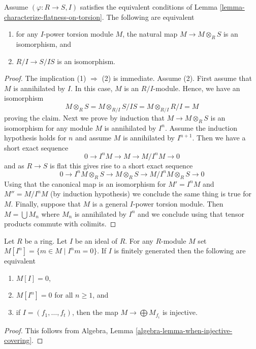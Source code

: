 \begin{lemma}
\label{lemma-neighbourhood-isomorphism}
Assume $(\varphi : R \to S, I)$ satisfies the equivalent conditions of
Lemma \ref{lemma-characterize-flatness-on-torsion}.
The following are equivalent
\begin{enumerate}
\item for any $I$-power torsion module $M$, the natural map
$M \to M \otimes_R S$ is an isomorphism, and
\item $R/I \to S/IS$ is an isomorphism.
\end{enumerate}
\end{lemma}

\begin{proof}
The implication (1) $\Rightarrow$ (2) is immediate.
Assume (2). First assume that $M$ is annihilated by $I$.
In this case, $M$ is an $R/I$-module. Hence, we have an isomorphism  
$$
M \otimes_R S = M \otimes_{R/I} S/IS = M \otimes_{R/I} R/I = M
$$
proving the claim. Next we prove by induction that $M \to M \otimes_R S$
is an isomorphism for any module $M$ is annihilated by $I^n$. Assume
the induction hypothesis holds for $n$ and assume $M$ is annihilated by
$I^{n + 1}$. Then we have a short exact sequence
$$
0 \to I^nM \to M \to M/I^nM \to 0
$$
and as $R \to S$ is flat this gives rise to a short exact sequence
$$
0 \to I^nM \otimes_R S \to M \otimes_R S \to M/I^nM \otimes_R S \to 0
$$
Using that the canonical map is an isomorphism for $M' = I^nM$ and
$M'' = M/I^nM$ (by induction hypothesis) we conclude the same thing is
true for $M$. Finally, suppose that $M$ is a general $I$-power torsion
module. Then $M = \bigcup M_n$ where $M_n$ is annihilated by $I^n$
and we conclude using that tensor products commute with colimits.
\end{proof}

\begin{lemma}
\label{lemma-torsion-free}
Let $R$ be a ring. Let $I$ be an ideal of $R$.
For any $R$-module $M$ set $M[I^n] = \{m \in M \mid I^nm = 0\}$.
If $I$ is finitely generated then the following are equivalent
\begin{enumerate}
\item $M[I] = 0$,
\item $M[I^n] = 0$ for all $n \geq 1$, and
\item if $I = (f_1, \ldots, f_t)$, then the map
$M \to \bigoplus M_{f_i}$ is injective.
\end{enumerate}
\end{lemma}

\begin{proof}
This follows from
Algebra, Lemma \ref{algebra-lemma-when-injective-covering}.
\end{proof}

